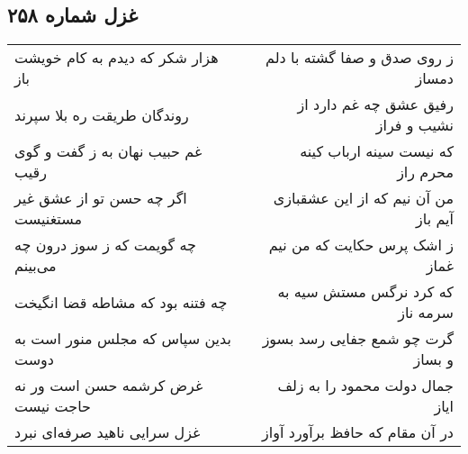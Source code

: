 \begin{center}
\section*{غزل شماره ۲۵۸}
\label{sec:sh258}
\begin{longtable}{l p{0.5cm} r}
هزار شکر که دیدم به کام خویشت باز
&&
ز روی صدق و صفا گشته با دلم دمساز
\\
روندگان طریقت ره بلا سپرند
&&
رفیق عشق چه غم دارد از نشیب و فراز
\\
غم حبیب نهان به ز گفت و گوی رقیب
&&
که نیست سینه ارباب کینه محرم راز
\\
اگر چه حسن تو از عشق غیر مستغنیست
&&
من آن نیم که از این عشقبازی آیم باز
\\
چه گویمت که ز سوز درون چه می‌بینم
&&
ز اشک پرس حکایت که من نیم غماز
\\
چه فتنه بود که مشاطه قضا انگیخت
&&
که کرد نرگس مستش سیه به سرمه ناز
\\
بدین سپاس که مجلس منور است به دوست
&&
گرت چو شمع جفایی رسد بسوز و بساز
\\
غرض کرشمه حسن است ور نه حاجت نیست
&&
جمال دولت محمود را به زلف ایاز
\\
غزل سرایی ناهید صرفه‌ای نبرد
&&
در آن مقام که حافظ برآورد آواز
\\
\end{longtable}
\end{center}
